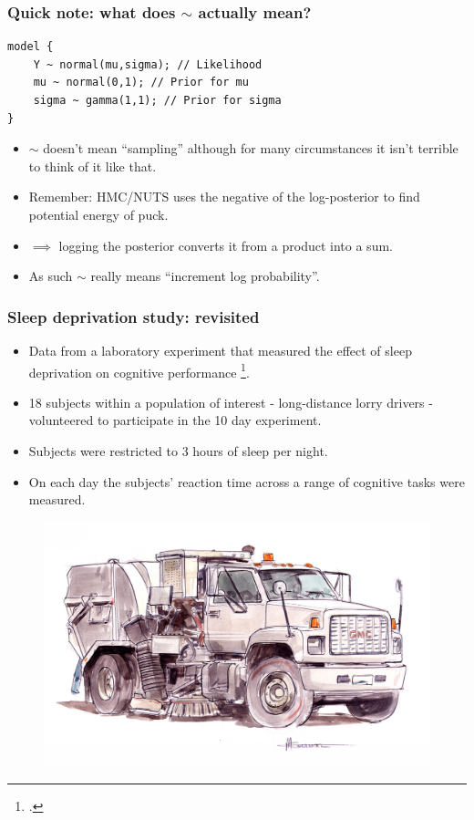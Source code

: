 \documentclass[handout]{beamer}
\begin{document}
\begin{frame}[fragile]
	\frametitle{Quick note: what does $\sim$ actually mean?}
	\begin{verbatim}
model {
    Y ~ normal(mu,sigma); // Likelihood
    mu ~ normal(0,1); // Prior for mu
    sigma ~ gamma(1,1); // Prior for sigma
}
	\end{verbatim}
	\begin{itemize}
		\item<2-> $\sim$ doesn't mean ``sampling'' although for many circumstances it isn't terrible to think of it like that.
		\item<3-> Remember: HMC/NUTS uses the negative of the log-posterior to find potential energy of puck.
		\item<4-> $\implies$ logging the posterior converts it from a product into a sum.
		\item<5-> As such $\sim$ really means ``increment log probability''.
	\end{itemize}
	
\end{frame}

\begin{frame}
	\frametitle{Sleep deprivation study: revisited}
	\begin{itemize}
		\item<2-> Data from a laboratory experiment that measured the effect of sleep deprivation on cognitive performance \footcite{belenky2003patterns}.
		\item<3-> 18 subjects within a population of interest - long-distance lorry drivers - volunteered to participate in the 10 day experiment.
		\item<4-> Subjects were restricted to 3 hours of sleep per night.
		\item<5-> On each day the subjects' reaction time across a range of cognitive tasks were measured.
	\end{itemize}
	
	\begin{figure}[ht]
		\includegraphics[width=1.0\textwidth]{./Figures/lorry.jpg}
	\end{figure}
	
\end{frame}
\end{document}
